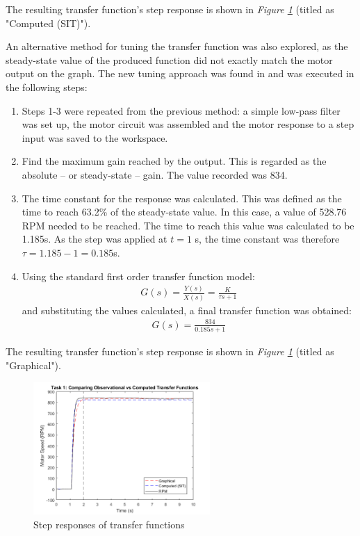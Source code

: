 \documentclass[11pt, onecolumn]{article}
\begin{document}
\par The resulting transfer function's step response is shown in \textit{Figure \ref{fig:q1-graph}} (titled as "Computed (SIT)").
\par An alternative method for tuning the transfer function was also explored, as the steady-state value of the produced function did not exactly match the motor output on the graph. The new tuning approach was found in \cite{umichControlTutorials} and was executed in the following steps:
\begin{enumerate}
    \item Steps 1-3 were repeated from the previous method: a simple low-pass filter was set up, the motor circuit was assembled and the motor response to a step input was saved to the workspace.
    \item Find the maximum gain reached by the output. This is regarded as the absolute – or steady-state – gain. The value recorded was 834.
    \item The time constant for the response was calculated. This was defined as the time to reach 63.2\% of the steady-state value. In this case, a value of 528.76 RPM needed to be reached. The time to reach this value was calculated to be 1.185s. As the step was applied at $t=1$ s, the time constant was therefore $\tau = 1.185 - 1 = 0.185$s.
    \item Using the standard first order transfer function model:
          \begin{align*}
              G(s)=\frac{Y(s)}{X(s)}=\frac{K}{\tau s + 1}
          \end{align*}
          and substituting the values calculated, a final transfer function was obtained:
          \begin{align*}
              G(s)=\frac{834}{0.185s + 1}
          \end{align*}
\end{enumerate}
\par The resulting transfer function's step response is shown in \textit{Figure \ref{fig:q1-graph}} (titled as "Graphical").
\begin{figure}[h!]
    \centering
    \includegraphics[width=0.6\textwidth]{q1-graphs.png}
    \caption{Step responses of transfer functions }
    \label{fig:q1-graph}
\end{figure}
\end{document}
